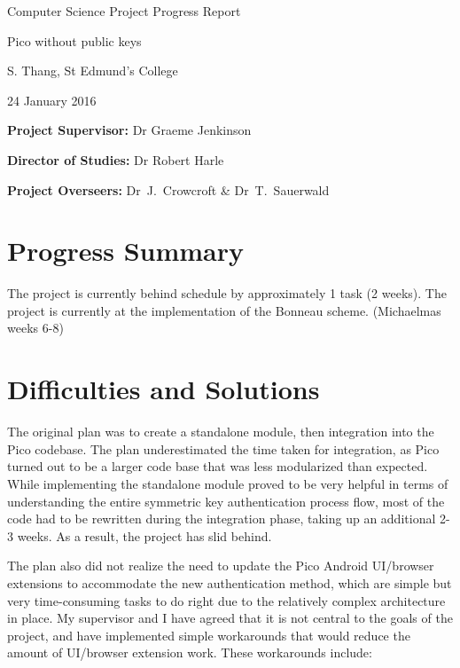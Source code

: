 \documentclass[12pt,a4paper,twoside]{article}
\begin{document}
\vfil

\centerline{\Large Computer Science Project Progress Report}
\vspace{0.4in}
\centerline{\Large Pico without public keys}
\vspace{0.4in}
\centerline{\large S. Thang, St Edmund’s College}
\vspace{0.3in}
\centerline{\large 24 January 2016}

\vfil


\noindent
{\bf Project Supervisor:} Dr Graeme Jenkinson
\vspace{0.2in}

\noindent
{\bf Director of Studies:} Dr Robert Harle
\vspace{0.2in}
\noindent
 
\noindent
{\bf Project Overseers:} Dr~J.~Crowcroft \& Dr~T.~Sauerwald



\section*{Progress Summary}


The project is currently behind schedule by approximately 1 task (2 weeks). The project is currently at the implementation of the Bonneau scheme. (Michaelmas weeks 6-8)

\section*{Difficulties and Solutions}

The original plan was to create a standalone module, then integration into the Pico codebase. The plan underestimated the time taken for integration, as Pico turned out to be a larger code base that was less modularized than expected. While implementing the standalone module proved to be very helpful in terms of understanding the entire symmetric key authentication process flow, most of the code had to be rewritten during the integration phase, taking up an additional 2-3 weeks. As a result, the project has slid behind.

The plan also did not realize the need to update the Pico Android UI/browser extensions to accommodate the new authentication method, which are simple but very time-consuming tasks to do right due to the relatively complex architecture in place. My supervisor and I have agreed that it is not central to the goals of the project, and have implemented simple workarounds that would reduce the amount of UI/browser extension work. These workarounds include: 
\end{document}
